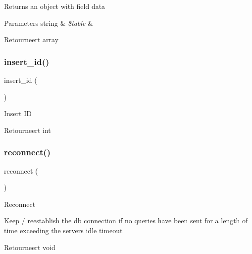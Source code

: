 Returns an object with field data


\begin{DoxyParams}[1]{Parameters}
string & {\em \$table} & \\
\hline
\end{DoxyParams}
\begin{DoxyReturn}{Retourneert}
array 
\end{DoxyReturn}
\mbox{\label{class_c_i___d_b__mysqli__driver_a933f2cde8dc7f87875e257d0a4902e99}} 
\subsubsection{\texorpdfstring{insert\_id()}{insert\_id()}}
{\footnotesize\ttfamily insert\+\_\+id (\begin{DoxyParamCaption}{ }\end{DoxyParamCaption})}

Insert ID

\begin{DoxyReturn}{Retourneert}
int 
\end{DoxyReturn}
\mbox{\label{class_c_i___d_b__mysqli__driver_a57c19c642ab3023e28d10c50f86ff0a8}} 
\subsubsection{\texorpdfstring{reconnect()}{reconnect()}}
{\footnotesize\ttfamily reconnect (\begin{DoxyParamCaption}{ }\end{DoxyParamCaption})}

Reconnect

Keep / reestablish the db connection if no queries have been sent for a length of time exceeding the server\textquotesingle{}s idle timeout

\begin{DoxyReturn}{Retourneert}
void 
\end{DoxyReturn}
\mbox{\label{class_c_i___d_b__mysqli__driver_a6080dae0886626b9a4cedb29240708b1}} 
